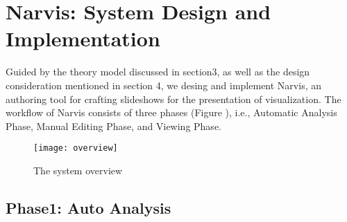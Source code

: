 \section{Narvis: System Design and Implementation}


Guided by the theory model discussed in section3, as well as the design consideration mentioned in section 4, we desing and implement Narvis, an authoring tool for crafting slideshows for the presentation of visualization. The workflow of Narvis consists of three phases (Figure ), i.e., Automatic Analysis Phase, Manual Editing Phase, and Viewing Phase.


\begin{figure}
 \centering %
 \texttt{[image: overview]}
 \caption{The system overview}
 \label{fig:overview}
\end{figure}

\subsection{Phase1: Auto Analysis}


